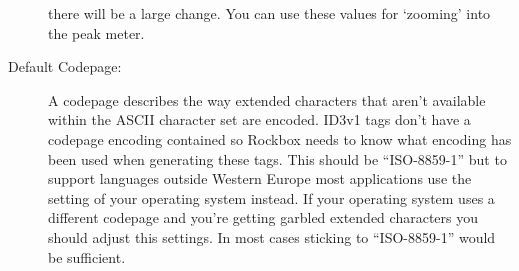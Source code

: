 \begin{description}
{\begin{description}
        there will be a large change. You can use these values for `zooming' 
        into the peak meter.
      \end{description}
    }
    \item[Default Codepage:]
      A codepage describes the way extended characters that aren't available
      within the ASCII character set are encoded. ID3v1 tags don't have a 
      codepage encoding contained so Rockbox needs to know what encoding has
      been used when generating these tags. This should be ``ISO-8859-1'' but
      to support languages outside Western Europe most applications use
      the setting of your operating system instead. If your operating system
      uses a different codepage and you're getting garbled extended characters
      you should adjust this settings. In most cases sticking to 
      ``ISO-8859-1'' would be sufficient.
  \end{description}
